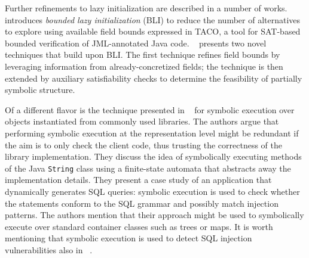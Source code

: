 Further refinements to lazy initialization are described in a number of works. \cite{BLI-NFM13} introduces {\em bounded lazy initialization} (BLI) to reduce the number of alternatives to explore using available field bounds expressed in TACO, a tool for SAT-based bounded verification of JML-annotated Java code. ~\cite{BLISS-TSE15} presents two novel techniques that build upon BLI. The first technique refines field bounds by leveraging information from already-concretized fields; the technique is then extended by  auxiliary satisfiability checks to determine the feasibility of partially symbolic structure.

Of a different flavor is the technique presented in ~\cite{SHZ-TAIC07} for symbolic execution over objects instantiated from commonly used libraries. The authors argue that performing symbolic execution at the representation level might be redundant if the aim is to only check the client code, thus trusting the correctness of the library implementation. They discuss the idea of symbolically executing methods of the Java {\tt String} class using a finite-state automata that abstracts away the implementation details. They present a case study of an application that dynamically generates SQL queries: symbolic execution is used to check whether the statements conform to the SQL grammar and possibly match injection patterns. The authors mention that their approach might be used to symbolically execute over standard container classes such as trees or maps. It is worth mentioning that symbolic execution is used to detect SQL injection vulnerabilities also in ~\cite{FLP-COMPSAC07}.